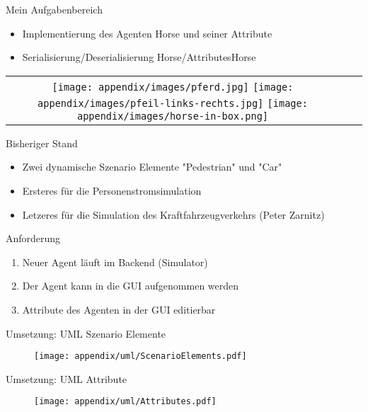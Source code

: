 \begin{frame}{Mein Aufgabenbereich}
	\begin{itemize}
		\item Implementierung des Agenten Horse und seiner Attribute
		\item Serialisierung/Deserialisierung Horse/AttributesHorse
	\end{itemize}

	\begin{tabular}{ccc}
		\texttt{[image: appendix/images/pferd.jpg]}
		\texttt{[image: appendix/images/pfeil-links-rechts.jpg]}
		\hspace{0.7em}
		\texttt{[image: appendix/images/horse-in-box.png]}
	\end{tabular}

\end{frame}

\begin{frame}{Bisheriger Stand}
	\begin{itemize}
		\item Zwei dynamische Szenario Elemente "Pedestrian" und "Car"
		\item Ersteres für die Personenstromsimulation
		\item Letzeres für die Simulation des Kraftfahrzeugverkehrs (Peter Zarnitz) \cite{zarnitz-2015}
	\end{itemize}
\end{frame}

\begin{frame}{Anforderung}
	\begin{enumerate}
		\item Neuer Agent läuft im Backend (Simulator)
		\item Der Agent kann in die GUI aufgenommen werden
		\item Attribute des Agenten in der GUI editierbar
	\end{enumerate}
\end{frame}

\begin{frame}{Umsetzung: UML Szenario Elemente}
	\begin{figure}
		\texttt{[image: appendix/uml/ScenarioElements.pdf]}
	\end{figure}
\end{frame}

\begin{frame}{Umsetzung: UML Attribute}
	\begin{figure}
		\texttt{[image: appendix/uml/Attributes.pdf]}
	\end{figure}
\end{frame}

